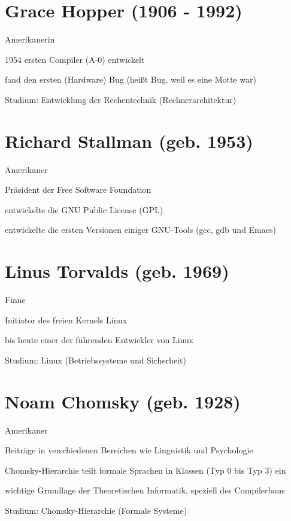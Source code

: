 \documentclass[a4paper,12pt]{report}
\begin{document}
\section*{Grace Hopper (1906 - 1992)}
\begin{itemize*}
	\item Amerikanerin
	\item 1954 ersten Compiler (A-0) entwickelt
	\item fand den ersten (Hardware) Bug (heißt Bug, weil es eine Motte war)
	\item Studium: Entwicklung der Rechentechnik (Rechnerarchitektur)
\end{itemize*}

\section*{Richard Stallman (geb. 1953)}
\begin{itemize*}
	\item Amerikaner
	\item Präsident der Free Software Foundation
	\item entwickelte die GNU Public License (GPL)
	\item entwickelte die ersten Versionen einiger GNU-Tools (gcc, gdb und Emacs)
\end{itemize*}

\section*{Linus Torvalds (geb. 1969)}
\begin{itemize*}
	\item Finne
	\item Initiator des freien Kernels Linux
	\item bis heute einer der führenden Entwickler von Linux
	\item Studium: Linux (Betriebssysteme und Sicherheit)
\end{itemize*}

\section*{Noam Chomsky (geb. 1928)}
\begin{itemize*}
	\item Amerikaner
	\item Beiträge in verschiedenen Bereichen wie Linguistik und Psychologie
	\item Chomsky-Hierarchie teilt formale Sprachen in Klassen (Typ 0 bis Typ 3) ein
	\item wichtige Grundlage der Theoretischen Informatik, speziell des Compilerbaus
	\item Studium: Chomsky-Hierarchie (Formale Systeme)
\end{itemize*}
\end{document}
